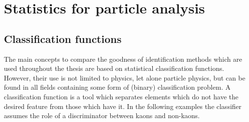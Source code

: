\chapter{Statistics for particle analysis}
\label{chap:statistics}

\section{Classification functions}
\label{sec:classification_functions}

The main concepts to compare the goodness of identification methods which are used throughout the thesis are based on statistical classification functions. However, their use is not limited to physics, let alone particle physics, but can be found in all fields containing some form of (binary) classification problem. A classification function is a tool which separates elements which do not have the desired feature from those which have it.
In the following examples the classifier assumes the role of a discriminator between kaons and non-kaons.

